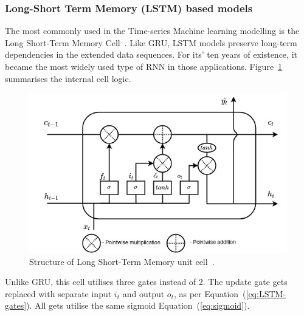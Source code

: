%
\subsubsection{Long-Short Term Memory (LSTM) based models} \label{subsub:lstm}
The most commonly used in the Time-series Machine learning modelling is the Long Short-Term Memory Cell~\cite{LSTM_Hochreiter1997}.
Like GRU, LSTM models preserve long-term dependencies in the extended data sequences.
For its' ten years of existence, it became the most widely used type of RNN in those applications.
\mbox{Figure~\ref{fig:LSTM-cell}} summarises the internal cell logic.
\begin{figure}[ht]%
    \centering
    \includegraphics[width=\linewidth]{II_Body/LSTM/images/LSTM.jpg}
    \caption{Structure of Long Short-Term Memory unit cell~\cite{Hochreiter:1997:LSM:1246443.1246450}.}
    \label{fig:LSTM-cell}
\end{figure}
Unlike GRU, this cell utilises three gates instead of 2.
The update gate gets replaced with separate input $i_t$ and output $o_t$, as per \mbox{Equation~(\ref{eq:LSTM-gates})}.
All gets utilise the same sigmoid \mbox{Equation~(\ref{eq:sigmoid})}.
